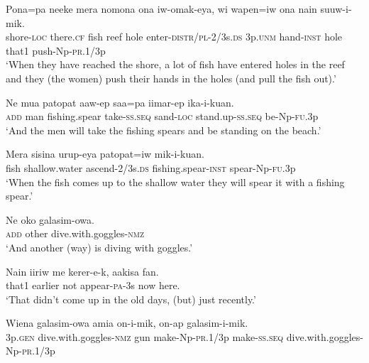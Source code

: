 \ea
\gll  Pona=pa  neeke  mera  nomona  ona  iw-omak-eya,    wi  wapen=iw  ona  nain  suuw-i-mik. \\
shore-\textsc{loc}  there.\textsc{cf}  fish  reef  hole  enter-\textsc{distr}/\textsc{pl}-2/3s.\textsc{ds}  3p.\textsc{unm}  hand-\textsc{inst}  hole  that1  push{}-Np-\textsc{pr}.1/3p \\


\glt ‘When they have reached the shore, a lot of fish have entered holes in the reef and they (the women) push their hands in the holes (and pull the fish out).’ \\
\z


\ea
\gll  Ne  mua  patopat  aaw-ep  saa=pa  iimar-ep                  ika-i-kuan. \\
\textsc{add}  man  fishing.spear  take-\textsc{ss.seq}  sand-\textsc{loc}  stand.up-\textsc{ss.seq}   be-Np-\textsc{fu}.3p \\


\glt ‘And the men will take the fishing spears and be standing on the beach.’ \\
\z


\ea
\gll  Mera  sisina  urup-eya  patopat=iw                 mik-i-kuan. \\
fish  shallow.water  ascend-2/3s.\textsc{ds}  fishing.spear-\textsc{inst}  spear-Np-\textsc{fu}.3p \\


\glt ‘When the fish comes up to the shallow water they will spear it with a fishing spear.’ \\
\z


\ea
\gll  Ne  oko  galasim-owa. \\
\textsc{add}  other  dive.with.goggles-\textsc{nmz} \\
\glt ‘And another (way) is diving with goggles.’ \\
\z


\ea
\gll  Nain  iiriw  me  kerer-e-k,  aakisa  fan. \\
that1  earlier  not  appear-\textsc{pa}-3s  now  here. \\
\glt ‘That didn’t come up in the old days, (but) just recently.’ \\
\z


\ea
\gll  Wiena  galasim-owa  amia  on-i-mik,           on-ap  galasim-i-mik. \\
3p.\textsc{gen}  dive.with.goggles-\textsc{nmz}  gun  make-Np-\textsc{pr}.1/3p make-\textsc{ss.seq}  dive.with.goggles-Np-\textsc{pr}.1/3p \\


